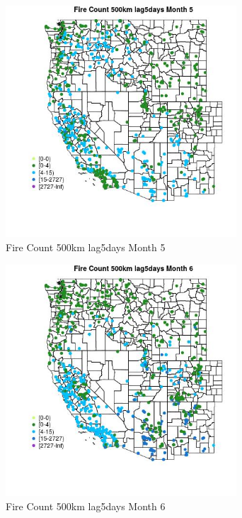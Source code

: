 \begin{figure} 
\centering  
\includegraphics[width=0.77\textwidth]{Code_Outputs/Report_ML_input_PM25_Step4_part_f_de_duplicated_aves_prioritize_24hr_obswNAs_MapObsMo5Fire_Count_500km_lag5days.jpg} 
\caption{\label{fig:Report_ML_input_PM25_Step4_part_f_de_duplicated_aves_prioritize_24hr_obswNAsMapObsMo5Fire_Count_500km_lag5days}Fire Count 500km lag5days Month 5} 
\end{figure} 
 

\begin{figure} 
\centering  
\includegraphics[width=0.77\textwidth]{Code_Outputs/Report_ML_input_PM25_Step4_part_f_de_duplicated_aves_prioritize_24hr_obswNAs_MapObsMo6Fire_Count_500km_lag5days.jpg} 
\caption{\label{fig:Report_ML_input_PM25_Step4_part_f_de_duplicated_aves_prioritize_24hr_obswNAsMapObsMo6Fire_Count_500km_lag5days}Fire Count 500km lag5days Month 6} 
\end{figure} 
 

